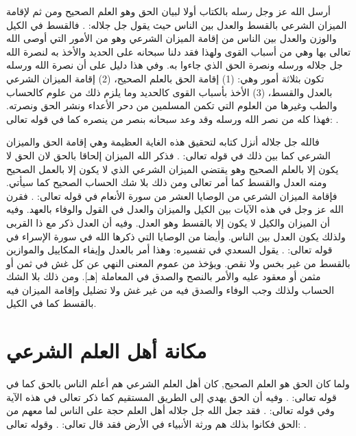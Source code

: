 أرسل الله عز وجل رسله بالكتاب أولا لبيان الحق وهو العلم الصحيح ومن ثم لإقامة الميزان الشرعي بالقسط والعدل بين الناس حيث يقول جل جلاله:
\quranayah*[57][25]{\footnotesize \surahname*[57]}. فالقسط في الكيل والوزن والعدل بين الناس من إقامة الميزان الشرعي وهو من الأمور التي أوصى الله تعالى بها وهي من أسباب القوى ولهذا فقد دلنا سبحانه على الحديد والأخذ به لنصرة الله جل جلاله ورسله ونصرة الحق الذي جاءوا به. وفي هذا دليل على أن نصرة الله ورسله تكون بثلاثة أمور وهي: (1) إقامة الحق بالعلم الصحيح، (2) إقامة الميزان الشرعي بالعدل والقسط، (3) الأخذ بأسباب القوى كالحديد وما يلزم ذلك من علوم كالحساب والطب وغيرها من العلوم التي تكمن المسلمين من دحر الأعداء ونشر الحق ونصرته. فهذا كله من نصر الله ورسله وقد وعد سبحانه بنصر من ينصره كما في قوله تعالى:
\quranayah*[47][7]{\footnotesize \surahname*[47]}.

فالله جل جلاله أنزل كتابه لتحقيق هذه الغاية العظيمة وهي إقامة الحق والميزان الشرعي كما بين ذلك في قوله تعالى:
\quranayah*[42][17]{\footnotesize \surahname*[42]}.
فذكر الله الميزان إلحاقا بالحق لان الحق لا يكون إلا بالعلم الصحيح وهو يقتضي الميزان الشرعي الذي لا يكون إلا بالعمل الصحيح ومنه العدل والقسط كما أمر تعالى ومن ذلك بلا شك الحساب الصحيح كما سيأتي. فإقامة الميزان الشرعي من الوصايا العشر من سورة الأنعام في قوله تعالى:
\quranayah*[6][152][12]{\footnotesize \surahname*[6]}. فقرن الله عز وجل في هذه الآيات بين الكيل والميزان والعدل في القول والوفاء بالعهد. وفيه أن الميزان والكيل لا يكون إلا بالقسط وهو العدل. وفيه أن العدل ذكر مع ذا القربى ولذلك يكون العدل بين الناس.
وأيضا من الوصايا التي ذكرها الله في سورة الإسراء في قوله تعالى:
\quranayah*[17][35]{\footnotesize \surahname*[17]}. يقول السعدي في تفسيره:
وهذا أمر بالعدل وإيفاء المكاييل والموازين بالقسط من غير بخس ولا نقص. ويؤخذ من عموم المعنى النهي عن كل غش في ثمن أو مثمن أو معقود عليه والأمر بالنصح والصدق في المعاملة [هـ]. ومن ذلك بلا الشك الحساب ولذلك وجب الوفاء والصدق فيه من غير غش ولا تضليل وإقامة الميزان فيه بالقسط كما في الكيل.


\section{مكانة أهل العلم الشرعي}

ولما كان الحق هو العلم الصحيح, كان أهل العلم الشرعي هم أعلم الناس بالحق كما في قوله تعالى:
\quranayah*[34][6]{\footnotesize \surahname*[34]}. وفيه أن الحق يهدي إلى الطريق المستقيم كما ذكر تعالى في هذه الآية وفي قوله تعالى:
\quranayah*[22][54]{\footnotesize \surahname*[22]}. فقد جعل الله جل جلاله أهل العلم حجة على الناس لما معهم من الحق فكانوا بذلك هم ورثة الأنبياء في الأرض فقد قال تعالى:
\quranayah*[17][107]{\footnotesize \surahname*[17]}.
وقوله تعالى:
\quranayah*[29][49]{\footnotesize \surahname*[29]}.


